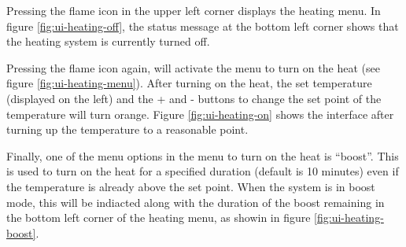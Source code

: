 Pressing the flame icon in the upper left corner displays the heating menu.
In figure \ref{fig:ui-heating-off}, the status message at the bottom left
corner shows that the heating system is currently turned off.

Pressing the flame icon again, will activate the menu to turn on the heat
(see figure \ref{fig:ui-heating-menu}).  After turning on the heat, the set
temperature (displayed on the left) and the + and - buttons to change the set
point of the temperature will turn orange.  Figure \ref{fig:ui-heating-on}
shows the interface after turning up the temperature to a reasonable point.

Finally, one of the menu options in the menu to turn on the heat is ``boost''.
This is used to turn on the heat for a specified duration (default is 10
minutes) even if the temperature is already above the set point.  When the
system is in boost mode, this will be indiacted along with the duration of the
boost remaining in the bottom left corner of the heating menu, as showin in
figure \ref{fig:ui-heating-boost}.
